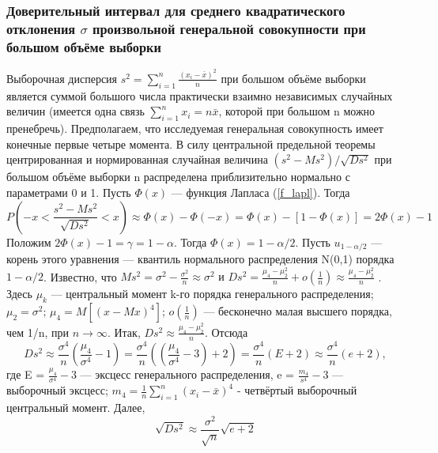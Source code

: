 \documentclass[a4paper]{article}
\begin{document}
    \subsubsection{Доверительный интервал для среднего квадратического отклонения $\sigma$ произвольной генеральной совокупности при большом объёме выборки}
    Выборочная дисперсия $s^{2} = \sum_{i = 1}^{n}{\frac{(x_{i} - \bar{x})^{2}}{n}}$ при большом объёме выборки является суммой большого числа практически взаимно независимых случайных величин (имеется одна связь $\sum_{i=1}^{n}{x_{i}} = n\bar{x}$, которой при большом n можно пренебречь). Предполагаем, что исследуемая генеральная совокупность имеет конечные первые четыре момента.
    \newline
    В силу центральной предельной теоремы центрированная и нормированная случайная величина $(s^{2}-Ms^{2})/\sqrt{D s^{2}}$ при большом объёме выборки n распределена приблизительно нормально с параметрами 0 и 1. Пусть $\Phi(x)$ — функция Лапласа (\ref{f_lapl}). Тогда
    \begin{equation}
        P\left(-x < \frac{s^{2}-Ms^{2}}{\sqrt{D s^{2}}} < x\right)
        \approx \Phi(x) - \Phi(-x)=\Phi(x) - [1 - \Phi(x)] = 2\Phi(x) - 1
        \label{P_as_sigma}
    \end{equation}
    Положим $2\Phi(x)-1 = \gamma = 1-\alpha$. Тогда $\Phi(x) = 1-\alpha/2$. Пусть $u_{1-\alpha/2}$ — корень этого уравнения — квантиль нормального распределения N(0,1) порядка $1-\alpha/2$. Известно, что $Ms^{2} = \sigma^{2} -\frac{\sigma^{2}}{n} \approx \sigma^{2} \text{ и } D s^{2} = \frac{\mu_{4} -\mu_{2}^{2}}{n} + o(\frac{1}{n}) \approx \frac{\mu_{4} -\mu_{2}^{2}}{n}$ . Здесь $\mu_{k}$ — центральный момент k-го порядка генерального распределения; $\mu_{2} = \sigma^{2}$; $\mu_{4} = M[(x-M x)^{4}]$︀; $o(\frac{1}{n})$ — бесконечно малая высшего порядка, чем 1/n, при $n\rightarrow \infty$. Итак, $D s^{2} \approx \frac{\mu_{4} -\mu_{2}^{2}}{n}$. Отсюда
    \begin{equation}
        D s^{2} \approx \frac{\sigma^{4}}{n}(\frac{\mu_{4}}{\sigma^{4}} - 1) = 
        \frac{\sigma^{4}}{n}((\frac{\mu_{4}}{\sigma^{4}} - 3) + 2) = \frac{\sigma^{4}}{n}(E + 2) \approx \frac{\sigma^{4}}{n}(e + 2),
        \label{Ds_2}
    \end{equation}
    где E = $\frac{\mu_{4}}{\sigma^{4}} - 3$ — эксцесс генерального распределения, e = $\frac{m_{4}}{s^{4}} - 3$ — выборочный эксцесс; $m_{4} = \frac{1}{n}\sum_{i =1}^{n}{(x_{i} - \bar{x})^{4}}$  - четвёртый выборочный центральный момент. Далее,
    \begin{equation}
        \sqrt{D s^{2}} \approx \frac{\sigma^{2}}{\sqrt{n}}\sqrt{e + 2}
        \label{sqrt_Ds}
    \end{equation}
\end{document}
